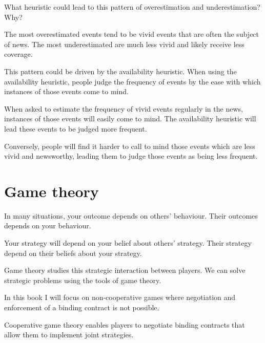 \documentclass[
  letterpaper,
  DIV=11,
  numbers=noendperiod]{scrreprt}
\begin{document}
What heuristic could lead to this pattern of overestimation and
underestimation? Why?

\begin{tcolorbox}[enhanced jigsaw, title=\textcolor{quarto-callout-tip-color}{\faLightbulb}\hspace{0.5em}{Answer}, toprule=.15mm, colback=white, breakable, titlerule=0mm, colframe=quarto-callout-tip-color-frame, coltitle=black, opacityback=0, rightrule=.15mm, colbacktitle=quarto-callout-tip-color!10!white, bottomtitle=1mm, opacitybacktitle=0.6, arc=.35mm, bottomrule=.15mm, toptitle=1mm, leftrule=.75mm, left=2mm]

The most overestimated events tend to be vivid events that are often the
subject of news. The most underestimated are much less vivid and likely
receive less coverage.

This pattern could be driven by the availability heuristic. When using
the availability heuristic, people judge the frequency of events by the
ease with which instances of those events come to mind.

When asked to estimate the frequency of vivid events regularly in the
news, instances of those events will easily come to mind. The
availability heuristic will lead these events to be judged more
frequent.

Conversely, people will find it harder to call to mind those events
which are less vivid and newsworthy, leading them to judge those events
as being less frequent.

\end{tcolorbox}

\part{Game theory}

In many situations, your outcome depends on others' behaviour. Their
outcomes depends on your behaviour.

Your strategy will depend on your belief about others' strategy. Their
strategy depend on their beliefs about your strategy.

Game theory studies this strategic interaction between players. We can
solve strategic problems using the tools of game theory.

In this book I will focus on non-cooperative games where negotiation and
enforcement of a binding contract is not possible.

Cooperative game theory enables players to negotiate binding contracts
that allow them to implement joint strategies.
\end{document}
